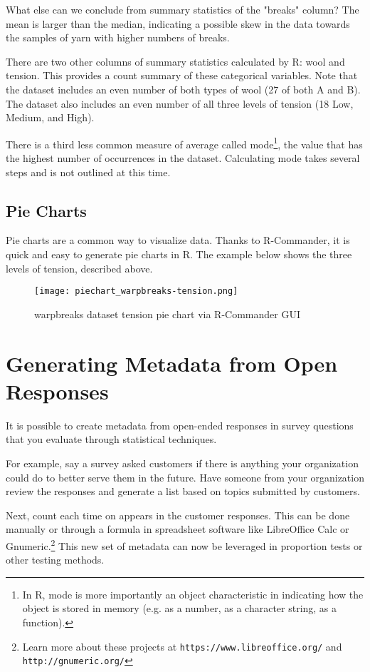 What else can we conclude from summary statistics of the "breaks" column? The 
mean is larger than the median, indicating a possible skew in the data towards 
the samples of yarn with higher numbers of breaks.

There are two other columns of summary statistics calculated by R: wool and 
tension. This provides a count summary of these categorical variables. Note 
that the dataset includes an even number of both types of wool (27 of both A 
and B). The dataset also includes an even number of all three levels of tension
 (18 Low, Medium, and High).

There is a third less common measure of average called mode\footnote{In R, mode
 is more importantly an object characteristic in indicating how the object is 
 stored in memory (e.g. as a number, as a character string, as a function).}, 
 the value that has the highest number of occurrences in the dataset. 
 Calculating mode takes several steps and is not outlined at this time.


\subsection{Pie Charts}
Pie charts are a common way to visualize data. Thanks to R-Commander, it is 
quick and easy to generate pie charts in R. The example below shows the three 
levels of tension, described above.

\begin{figure}[htbp]
\texttt{[image: piechart\_warpbreaks-tension.png]}
 \caption{warpbreaks dataset tension pie chart via R-Commander GUI}
 \label{fig:summary_warpbreaks}
\end{figure}

\section{Generating Metadata from Open Responses}
It is possible to create metadata from open-ended responses in survey questions
 that you evaluate through statistical techniques.

For example, say a survey asked customers if there is anything your 
organization could do to better serve them in the future. Have someone from 
your organization review the responses and generate a list based on topics 
submitted by customers. 

Next, count each time on appears in the customer responses. This can be done 
manually or through a formula in spreadsheet software like LibreOffice Calc or 
Gnumeric.\footnote{Learn more about these projects at 
\texttt{https://www.libreoffice.org/} and \texttt{http://gnumeric.org/}} This 
new set of metadata can now be leveraged in proportion tests or other testing 
methods.